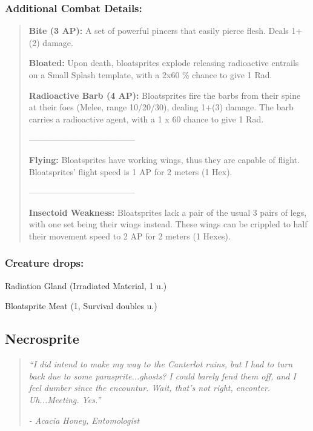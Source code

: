 \documentclass[11pt,a4paper,twocolumn]{book}
\begin{document}
	\subsubsection*{Additional Combat Details:}
	\begin{verse}
		\textbf{Bite (3 AP):} A set of powerful pincers that easily pierce flesh. Deals 1+(2) damage. 
		
		\textbf{Bloated:} Upon death, bloatsprites explode releasing radioactive entrails on a Small Splash template, with a 2x60 \%  chance to give 1 Rad.
		
		\textbf{Radioactive Barb (4 AP):} Bloatsprites fire the barbs from their spine at their foes (Melee, range 10/20/30), dealing 1+(3) damage. The barb carries a radioactive agent, with a 1 x 60 chance to give 1 Rad. 
		
		--------------------------------------
		
		\textbf{Flying:} Bloatsprites have working wings, thus they are capable of flight. Bloatsprites' flight speed is 1 AP for 2 meters (1 Hex).
		
				--------------------------------------
		
		\textbf{Insectoid Weakness:} Bloatsprites lack a pair of the usual 3 pairs of legs, with one set being their wings instead. These wings can be crippled to half their movement speed to 2 AP for 2 meters (1 Hexes).
	
	\end{verse}
	
	\subsubsection*{Creature drops:}
	\begin{compactitem}
		\item Radiation Gland (Irradiated Material, 1 u.)
		\item Bloatsprite Meat (1, Survival doubles u.)
	\end{compactitem}
	
	\vfill
	
	\subsection*{Necrosprite}
	\begin{quote}
		\emph{``I did intend to make my way to the Canterlot ruins, but I had to turn back due to some parasprite...ghosts? I could barely fend them off, and I feel dumber since the encountur. Wait, that's not right, enconter. Uh...Meeting. Yes.''}
		
		\emph{-	Acacia Honey, Entomologist}
	\end{quote}
	
\end{document}
